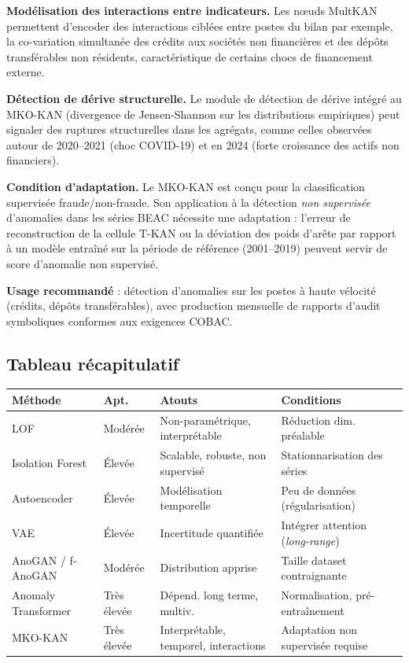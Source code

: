 \documentclass[12pt, a4paper]{article}
\begin{document}
\textbf{Modélisation des interactions entre indicateurs.}
Les nœuds MultKAN permettent d'encoder des interactions ciblées entre postes
du bilan  par exemple, la co-variation simultanée des crédits aux
sociétés non financières et des dépôts transférables non résidents,
caractéristique de certains chocs de financement externe.

\textbf{Détection de dérive structurelle.}
Le module de détection de dérive intégré au MKO-KAN (divergence de
Jensen-Shannon sur les distributions empiriques) peut signaler des ruptures
structurelles dans les agrégats, comme celles observées autour de 2020--2021
(choc COVID-19) et en 2024 (forte croissance des actifs non financiers).

\textbf{Condition d'adaptation.}
Le MKO-KAN est conçu pour la classification supervisée fraude/non-fraude.
Son application à la détection \textit{non supervisée} d'anomalies dans les
séries BEAC nécessite une adaptation : l'erreur de reconstruction de la
cellule T-KAN ou la déviation des poids d'arête par rapport à un modèle
entraîné sur la période de référence (2001--2019) peuvent servir de score
d'anomalie non supervisé.

\textbf{Usage recommandé} : détection d'anomalies sur les postes à haute
vélocité (crédits, dépôts transférables), avec production mensuelle de
rapports d'audit symboliques conformes aux exigences COBAC.

\subsection{Tableau récapitulatif}

\begin{longtable}{p{3.5cm} p{2cm} p{4cm} p{4cm}}
\toprule
\textbf{Méthode} & \textbf{Apt.} & \textbf{Atouts} & \textbf{Conditions} \\
\midrule
\endhead
LOF & Modérée & Non-paramétrique, interprétable & Réduction dim. préalable\\
Isolation Forest & Élevée & Scalable, robuste, non supervisé & Stationnarisation des séries\\
Autoencoder & Élevée & Modélisation temporelle & Peu de données (régularisation)\\
VAE & Élevée & Incertitude quantifiée & Intégrer attention (\textit{long-range})\\
AnoGAN / f-AnoGAN & Modérée & Distribution apprise & Taille dataset contraignante\\
Anomaly Transformer & Très élevée & Dépend. long terme, multiv. & Normalisation, pré-entraînement\\
MKO-KAN & Très élevée & Interprétable, temporel, interactions & Adaptation non supervisée requise\\
\bottomrule
\end{longtable}
\end{document}
